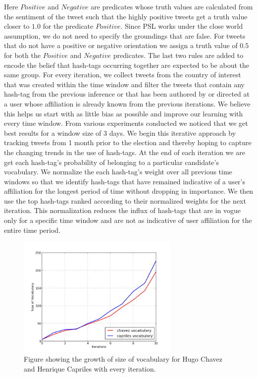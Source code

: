 Here $Positive$ and $Negative$ are predicates whose truth values are calculated from the sentiment of the tweet such that the highly positive tweets get a truth value closer to $1.0$ for the predicate $Positive$. 
Since PSL works under the close world assumption, we do not need to specify the groundings that are false.
For tweets that do not have a positive or negative orientation we assign a truth value of $0.5$ for both the $Positive$ and $Negative$ predicates.
The last two rules are added to encode the belief that hash-tags occurring together are expected to be about the same group.
For every iteration, we collect tweets from the country of interest that was created within the time window and filter the tweets that contain any hash-tag from the previous inference  or that has been authored by or directed at a user whose affiliation is already known from the previous iterations.
We believe this helps us start with as little bias as possible and improve our learning with every time window.
From various experiments conducted we noticed that we get best results for a window size of 3 days. 
We begin this iterative approach by tracking tweets from 1 month prior to the election and thereby hoping to capture the changing trends in the use of hash-tags.
At the end of each iteration we are get each hash-tag's probability of belonging to a particular candidate's vocabulary. 
We normalize the each hash-tag's weight over all previous time windows so that we identify hash-tags that have remained indicative of a user's affiliation for the longest period of time without dropping in importance. 
We then use the top hash-tags ranked according to their normalized weights  for the next iteration.
This normalization reduces the influx of hash-tags that are in vogue only for a specific time window and are not as indicative of user affiliation for the entire time period. 
\newline
\begin{figure}
	\centering
	\includegraphics[width=0.7\textwidth, height=0.3\textheight]{support_files/WordGrowth.png}
	\vspace{-1em}
	\caption{Figure showing the growth of size of vocabulary for Hugo Chavez and Henrique Capriles with every iteration.}
	\label{fig:wordgrowth}
	\vspace{-1em}
\end{figure}

